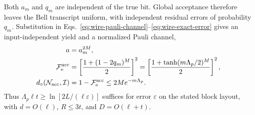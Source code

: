 \documentclass[aps,prl,twocolumn,superscriptaddress,longbibliography,reprint,floatfix]{revtex4-2}
\newcommand{\id}{\mathcal I}
\newcommand{\eps}{\varepsilon}
\newcommand{\Fe}{\mathcal F_{\mathrm e}}
\newcommand{\channel}{\mathcal N}
\begin{document}
Both $a_m$ and $q_m$ are independent of the true bit. Global acceptance
therefore leaves the Bell transcript uniform, with independent residual
errors of probability $q_m$. Substitution in
Eqs.~\eqref{eq:wire-pauli-channel}--\eqref{eq:wire-exact-error} gives an
input-independent yield and a normalized Pauli channel,
\begin{equation}
 \begin{aligned}
 a&=a_m^{2M},\\
 \Fe^{\rm acc}
  &=\left[\frac{1+(1-2q_m)^M}{2}\right]^2
    =\left[\frac{1+\tanh(m\Lambda_p/2)^M}{2}\right]^2,\\
 d_\diamond(\channel_{\rm acc},\id)
  &=1-\Fe^{\rm acc}
    \le 2M e^{-m\Lambda_p}.
 \end{aligned}
 \label{eq:unanimity-channel}
\end{equation}
Thus $\Lambda_p\ell t\ge\ln[2L/(\ell\eps)]$ suffices for error $\eps$
on the stated block layout, with $d=O(\ell)$, $R\le3t$, and $D=O(\ell+t)$.
\end{document}
